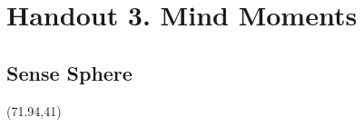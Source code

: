 \documentclass[a4 paper, 12pt]{article}
\begin{document}
\pagestyle{empty}

\makeatletter
{}
\makeatother

\graphicspath{{../}}

\section*{Handout 3. Mind Moments}

\subsection*{Sense Sphere}

\setlength{\tabcolsep}{0pt}
\renewcommand{\arraystretch}{1.1}
\setlength{\TPHorizModule}{1mm}
\setlength{\TPVertModule}{1mm}

\begin{textblock}{1}(71.94,41)

\end{textblock}
\end{document}
